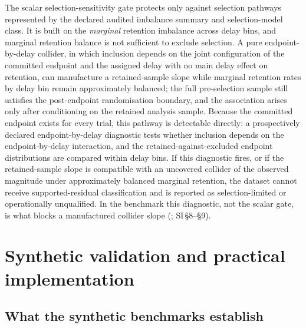 \documentclass[11pt,a4paper]{article}
\theoremstyle{definition}
\begin{document}
The scalar selection-sensitivity gate protects only against selection pathways
represented by the declared audited imbalance summary and selection-model class.
It is built on the \textit{marginal} retention imbalance across delay bins, and
marginal retention balance is not sufficient to exclude selection. A pure
endpoint-by-delay collider, in which inclusion depends on the joint configuration
of the committed endpoint and the assigned delay with no main delay effect on
retention, can manufacture a retained-sample slope while marginal retention rates
by delay bin remain approximately balanced; the full pre-selection sample still
satisfies the post-endpoint randomisation boundary, and the association arises
only after conditioning on the retained analysis sample. Because the committed
endpoint exists for every trial, this pathway is detectable directly: a
prospectively declared endpoint-by-delay diagnostic tests whether inclusion
depends on the endpoint-by-delay interaction, and the retained-against-excluded
endpoint distributions are compared within delay bins. If this diagnostic fires,
or if the retained-sample slope is compatible with an uncovered collider of the
observed magnitude under approximately balanced marginal retention, the dataset
cannot receive supported-residual classification and is reported as
selection-limited or operationally unqualified. In the benchmark this diagnostic,
not the scalar gate, is what blocks a manufactured collider slope
(; SI\,\S8--\S9).

\section{Synthetic validation and practical implementation}
\label{sec:synthetic-validation}

\subsection{What the synthetic benchmarks establish}
\label{sec:benchmark-role}
\end{document}
